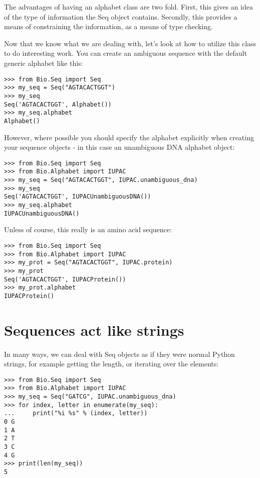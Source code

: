 \documentclass{report}
\begin{document}
The advantages of having an alphabet class are two fold. First, this gives an idea of the type of information the Seq object contains. Secondly, this provides a means of constraining the information, as a means of type checking.

Now that we know what we are dealing with, let's look at how to utilize this class to do interesting work.
You can create an ambiguous sequence with the default generic alphabet like this:

\begin{verbatim}
>>> from Bio.Seq import Seq
>>> my_seq = Seq("AGTACACTGGT")
>>> my_seq
Seq('AGTACACTGGT', Alphabet())
>>> my_seq.alphabet
Alphabet()
\end{verbatim}

However, where possible you should specify the alphabet explicitly when creating your sequence objects - in this case an unambiguous DNA alphabet object:

\begin{verbatim}
>>> from Bio.Seq import Seq
>>> from Bio.Alphabet import IUPAC
>>> my_seq = Seq("AGTACACTGGT", IUPAC.unambiguous_dna)
>>> my_seq
Seq('AGTACACTGGT', IUPACUnambiguousDNA())
>>> my_seq.alphabet
IUPACUnambiguousDNA()
\end{verbatim}

Unless of course, this really is an amino acid sequence:

\begin{verbatim}
>>> from Bio.Seq import Seq
>>> from Bio.Alphabet import IUPAC
>>> my_prot = Seq("AGTACACTGGT", IUPAC.protein)
>>> my_prot
Seq('AGTACACTGGT', IUPACProtein())
>>> my_prot.alphabet
IUPACProtein()
\end{verbatim}

\section{Sequences act like strings}

In many ways, we can deal with Seq objects as if they were normal Python strings, for example getting the length, or iterating over the elements:

\begin{verbatim}
>>> from Bio.Seq import Seq
>>> from Bio.Alphabet import IUPAC
>>> my_seq = Seq("GATCG", IUPAC.unambiguous_dna)
>>> for index, letter in enumerate(my_seq):
...     print("%i %s" % (index, letter))
0 G
1 A
2 T
3 C
4 G
>>> print(len(my_seq))
5
\end{verbatim}
\end{document}
